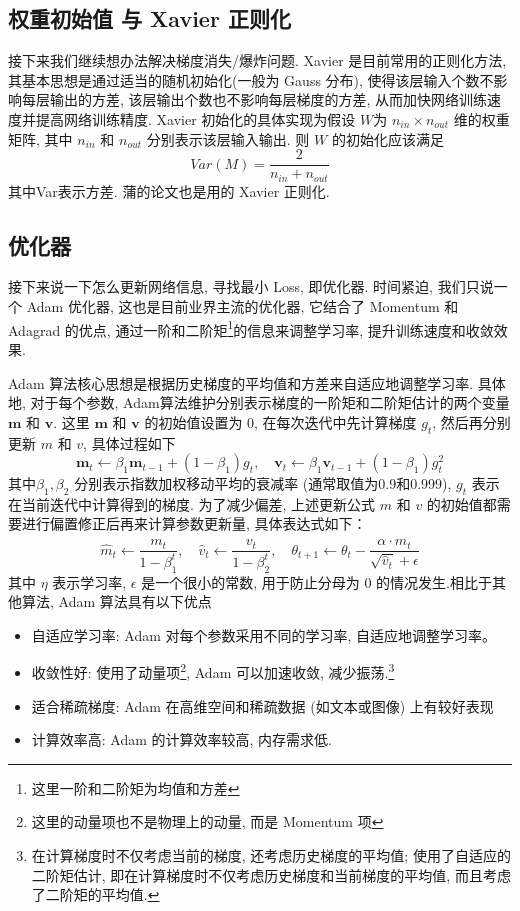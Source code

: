 \documentclass[lang=cn,a4paper,newtx]{elegantpaper}
\begin{document}
\subsection{权重初始值 与 Xavier 正则化}
接下来我们继续想办法解决梯度消失/爆炸问题. Xavier 是目前常用的正则化方法, 其基本思想是通过适当的随机初始化(一般为 Gauss 分布), 使得该层输入个数不影响每层输出的方差, 该层输出个数也不影响每层梯度的方差, 从而加快网络训练速度并提高网络训练精度. Xavier 初始化的具体实现为假设 $ W $为 $ n_{in} \times n_{out} $ 维的权重矩阵, 其中 $ n_{in}$  和 $ n_{out} $ 分别表示该层输入输出. 则 $ W $ 的初始化应该满足
\begin{equation}
    Var(M) = \frac{2}{n_{in}+n_{out}}
\end{equation}
其中Var表示方差. 蒲的论文也是用的 Xavier 正则化.
\subsection{优化器}
接下来说一下怎么更新网络信息, 寻找最小 Loss, 即优化器. 时间紧迫, 我们只说一个 Adam\cite{Adam} 优化器, 这也是目前业界主流的优化器, 它结合了 Momentum 和 Adagrad 的优点, 通过一阶和二阶矩\footnote{这里一阶和二阶矩为均值和方差}的信息来调整学习率, 提升训练速度和收敛效果. 

Adam 算法核心思想是根据历史梯度的平均值和方差来自适应地调整学习率. 具体地, 对于每个参数, Adam算法维护分别表示梯度的一阶矩和二阶矩估计的两个变量 $ \textbf{m} $ 和 $ \textbf{v} $. 这里 $ \textbf{m} $ 和 $ \textbf{v} $ 的初始值设置为 0, 在每次迭代中先计算梯度 $ g_{t} $, 然后再分别更新 $ m $ 和 $ v$, 具体过程如下
\begin{equation}
    \textbf{m}_t \leftarrow \beta_{1} \textbf{m}_{t-1} + (1-\beta_1)g_t, \quad \textbf{v}_t \leftarrow \beta_{1} \textbf{v}_{t-1} + (1-\beta_1)g_{t}^{2}
\end{equation}
其中$ \beta_1, \beta_2 $ 分别表示指数加权移动平均的衰减率 (通常取值为0.9和0.999), $ g_t $ 表示在当前迭代中计算得到的梯度. 为了减少偏差, 上述更新公式 $ m $ 和 $ v $ 的初始值都需要进行偏置修正后再来计算参数更新量, 具体表达式如下：
\begin{equation}
    \hat{m}_t \leftarrow \frac{m_t}{1 - \beta_{1}^t}, \quad 
    \hat{v}_t \leftarrow \frac{v_t}{1 - \beta_{2}^t}, \quad
    \theta_{t+1} \leftarrow \theta_t - \frac{\alpha \cdot \hat{m}_t}{\sqrt{\hat{v}_t} + \epsilon}
\end{equation}
其中 $ \eta $ 表示学习率, $ \epsilon $ 是一个很小的常数, 用于防止分母为 0 的情况发生.相比于其他算法, Adam 算法具有以下优点
\begin{itemize}
    \item 自适应学习率: Adam 对每个参数采用不同的学习率, 自适应地调整学习率。
    \item 收敛性好: 使用了动量项\footnote{这里的动量项也不是物理上的动量, 而是 Momentum 项}, Adam 可以加速收敛, 减少振荡.\footnote{在计算梯度时不仅考虑当前的梯度, 还考虑历史梯度的平均值; 使用了自适应的二阶矩估计, 即在计算梯度时不仅考虑历史梯度和当前梯度的平均值, 而且考虑了二阶矩的平均值.}
    \item 适合稀疏梯度: Adam 在高维空间和稀疏数据 (如文本或图像) 上有较好表现
    \item 计算效率高: Adam 的计算效率较高, 内存需求低. 
\end{itemize}
\end{document}

